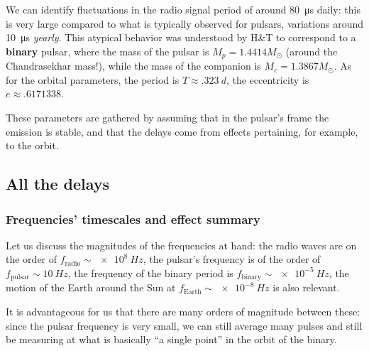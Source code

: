 \documentclass[main.tex]{subfiles}
\begin{document}

We can identify fluctuations in the radio signal  period of around \SI{80}{\micro s} daily: this is very large compared to what is typically observed for pulsars, variations around \SI{10}{\micro s} \emph{yearly}.
This atypical behavior was understood by H\&T to correspond to a \textbf{binary} pulsar, where the mass of the pulsar is \(M_p = \num{1.4414} M_{\odot}\) (around the Chandrasekhar mass!), while the mass of the companion is  \(M_c = \num{1.3867} M_{\odot}\). 
As for the orbital parameters, the period is \(T \approx \SI{.323}{d}\), the eccentricity is \(e \approx \num{.6171338}\).


These parameters are gathered by assuming that in the pulsar's frame the emission is stable, and that the delays come from effects pertaining, for example, to the orbit.

\subsection{All the delays}

\subsubsection{Frequencies' timescales and effect summary} 

Let us discuss the magnitudes of the frequencies at hand: the radio waves are on the order of \(f _{\text{radio}}\sim\SI{e8}{Hz}\), the pulsar's frequency is of the order of \(f _{\text{pulsar}}\sim\SI{10}{Hz}\), the frequency of the binary period is \(f _{\text{binary}} \sim\SI{e-5}{Hz}\), the motion of the Earth around the Sun at \(f _{\text{Earth}} \sim \SI{e-8}{Hz}\) is also relevant. 

It is advantageous for us that there are many orders of magnitude between these: since the pulsar frequency is very small, we can still average many pulses and still be measuring at what is basically ``a single point'' in the orbit of the binary.
\end{document}
